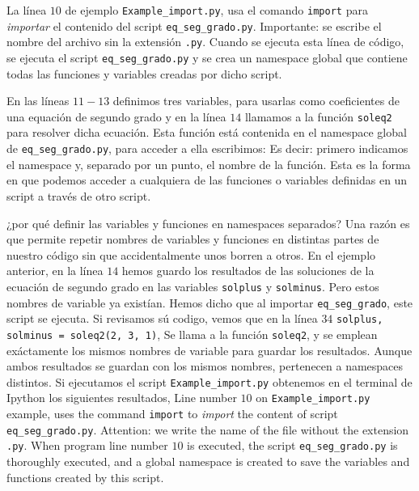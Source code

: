 \begin{paracol}{2}
La línea $10$ de ejemplo \texttt{Example_import.py}, usa el comando \texttt{import} para \emph{importar} el contenido del script \texttt{eq_seg_grado.py}. Importante: se escribe el nombre del archivo sin la extensión \texttt{.py}. Cuando se ejecuta esta línea de código, se ejecuta el script \texttt{eq_seg_grado.py} y se crea un namespace global que contiene todas las funciones y variables creadas por dicho script.

En las líneas $11-13$ definimos tres variables, para usarlas como coeficientes de una equación de segundo grado y en la línea $14$ llamamos a la función \texttt{soleq2} para resolver dicha ecuación. Esta función está contenida en el namespace global de \texttt{eq_seg_grado.py}, para acceder a ella escribimos:
Es decir: primero indicamos el namespace y, separado por un punto, el nombre de la función. Esta es la forma en que podemos acceder a cualquiera de las funciones o variables definidas en un script a través de otro script.

¿por qué definir las variables y funciones en namespaces separados? Una razón es que permite repetir nombres de variables y funciones en distintas partes de nuestro código sin que accidentalmente unos borren a otros. En el ejemplo anterior, en la línea $14$ hemos guardo los resultados de las soluciones de la ecuación de segundo grado en las variables \texttt{solplus} y \texttt{solminus}. Pero estos nombres de variable ya existían. Hemos dicho que al importar \texttt{eq_seg_grado}, este script se ejecuta. Si revisamos sú codigo, vemos que en la línea $34$ \texttt{solplus, solminus = soleq2(2, 3, 1)}, Se llama a la función \texttt{soleq2}, y se emplean exáctamente los mismos nombres de variable para guardar los resultados. Aunque ambos resultados se guardan con los mismos nombres, pertenecen a namespaces distintos. Si ejecutamos el script \texttt{Example_import.py} obtenemos en el terminal de Ipython los siguientes resultados,
\switchcolumn
Line number $10$ on \texttt{Example_import.py} example, uses the command \texttt{import} to \emph{import} the content of script \texttt{eq_seg_grado.py}. Attention: we write the name of the file without the extension \texttt{.py}. When program line number $10$ is executed, the script \texttt{eq_seg_grado.py} is thoroughly executed, and a global namespace is created to save the variables and functions created by this script.


\end{paracol}
